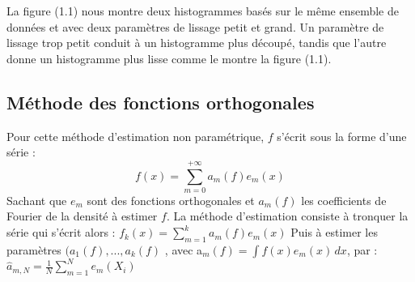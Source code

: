 La figure (1.1) nous montre deux histogrammes basés sur le même ensemble de données et avec deux paramètres de lissage petit et grand. Un paramètre de lissage trop petit conduit à un histogramme plus découpé, tandis que l’autre donne un histogramme plus lisse comme le montre la figure (1.1).

\subsection{Méthode des fonctions orthogonales}
Pour cette méthode d’estimation non paramétrique, $f$ s’écrit sous la forme d’une série :
\begin{equation}
f(x) = \sum_{m=0}^{+\infty} a_m(f) e_m(x)
\end{equation}
Sachant que $e_m$ sont des fonctions orthogonales \newline et $a_m(f)$ les coefficients de Fourier de la densité à estimer $f$.
\newline
\newline
La méthode d’estimation consiste à tronquer la série qui s’écrit alors : 
\newline
$f_k (x)=\sum_{m=1}^k a_m (f)e_m (x)$
\newline
\newline
Puis à estimer les paramètres $(a_1 (f),...  ,a_k (f)$ , avec a$_m (f) = \int f(x) e_m (x)\,dx$, par :
\newline
${\hat a}_{m,N}=\frac{1}{N}\sum_{m=1}^{N}e_{m}(X_i)$
